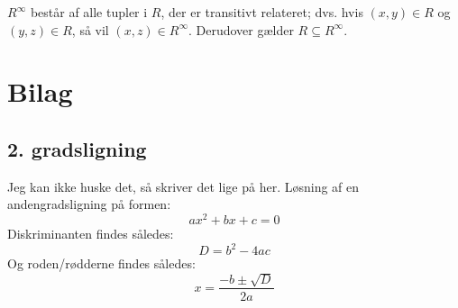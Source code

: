 \documentclass[a4paper]{article}
\begin{document}
$R^\infty$ består af alle tupler i $R$, der er transitivt relateret; dvs. hvis $(x, y) \in R$
og $(y, z) \in R$, så vil $(x, z) \in R^\infty$. Derudover gælder $R \subseteq R^\infty$.

\section{Bilag}
  \subsection{2. gradsligning}
  Jeg kan ikke huske det, så skriver det lige på her. Løsning af en andengradsligning på formen:
  \begin{equation}
    ax^2+bx+c=0
  \end{equation}
  Diskriminanten findes således:
  \begin{equation}
    D=b^2-4ac
  \end{equation}
  Og roden/rødderne findes således:
  \begin{equation}
    x = \frac{-b\pm \sqrt{D}}{2a}
  \end{equation}
\end{document}
